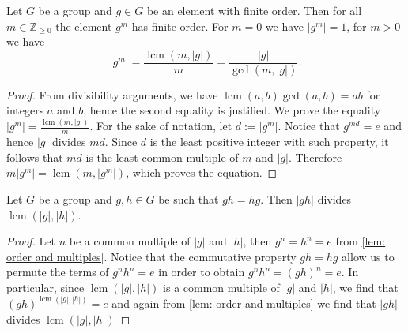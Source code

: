 \begin{proposition}
  Let \(G\) be a group and \(g \in G\) be an element with finite order. Then for
  all \(m \in \mathbb{Z}_{\geq 0}\) the element \(g^m\) has finite order. For
  \(m = 0\) we have \(|g^m| = 1\), for \(m > 0\) we have
  \[
    |g^m| = \frac{\operatorname{lcm}(m, |g|)}{m} =
    \frac{|g|}{\operatorname{gcd}(m, |g|)}.
  \] 
\end{proposition}

\begin{proof}
  From divisibility arguments, we have \(\operatorname{lcm}(a, b)
  \operatorname{gcd}(a, b) = ab\) for integers \(a\) and \(b\), hence the second
  equality is justified. We prove the equality \(|g^m| =
  \frac{\operatorname{lcm}(m, |g|)} m\). For the sake of notation, let \(d :=
  |g^m|\). Notice that \(g^{m d} = e\) and hence \(|g|\) divides \(m d\). Since
  \(d\) is the least positive integer with such property, it follows that \(m
  d\) is the least common multiple of \(m\) and \(|g|\). Therefore \(m |g^m| =
  \operatorname{lcm}(m, |g^m|)\), which proves the equation.
\end{proof}

\begin{proposition}
  Let \(G\) be a group and \(g, h \in G\) be such that \(g h = h g\). Then \(|g
  h|\) divides \(\operatorname{lcm}(|g|, |h|)\).
\end{proposition}

\begin{proof}
  Let \(n\) be a common multiple of \(|g|\) and \(|h|\), then \(g^n = h^n = e\)
  from \cref{lem: order and multiples}. Notice that the commutative property \(g
  h = h g\) allow us to permute the terms of \(g^n h^n = e\) in order to obtain
  \(g^n h^n = (g h)^n = e\). In particular, since \(\operatorname{lcm}(|g|,
  |h|)\) is a common multiple of \(|g|\) and \(|h|\), we find that \((g
  h)^{\operatorname{lcm}(|g|, |h|)} = e\) and again from \cref{lem: order and
  multiples} we find that \(|g h|\) divides \(\operatorname{lcm}(|g|, |h|)\)
\end{proof}

